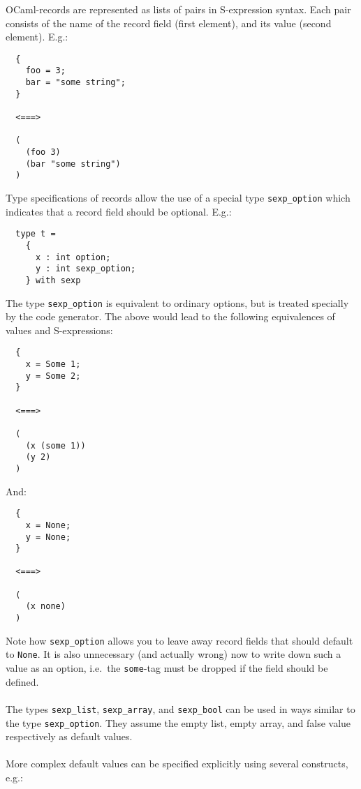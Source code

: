 \documentclass[a4paper]{article}
\begin{document}
OCaml-records are represented as lists of pairs in S-expression syntax.
Each pair consists of the name of the record field (first element),
and its value (second element).  E.g.:

\begin{verbatim}
  {
    foo = 3;
    bar = "some string";
  }

  <===>

  (
    (foo 3)
    (bar "some string")
  )
\end{verbatim}

Type specifications of records allow the use of a special type
\verb=sexp_option= which indicates that a record field should be optional.
E.g.:

\begin{verbatim}
  type t =
    {
      x : int option;
      y : int sexp_option;
    } with sexp
\end{verbatim}

The type \verb=sexp_option= is equivalent to ordinary options, but is
treated specially by the code generator.  The above would lead to the
following equivalences of values and S-expressions:

\begin{verbatim}
  {
    x = Some 1;
    y = Some 2;
  }

  <===>

  (
    (x (some 1))
    (y 2)
  )
\end{verbatim}

\noindent And:

{\samepage
\begin{verbatim}
  {
    x = None;
    y = None;
  }

  <===>

  (
    (x none)
  )
\end{verbatim}
}

Note how \verb=sexp_option= allows you to leave away record fields
that should default to \verb=None=.  It is also unnecessary (and
actually wrong) now to write down such a value as an option, i.e.\
the \verb=some=-tag must be dropped if the field should be defined.\\
\\
The types \verb=sexp_list=, \verb=sexp_array=, and \verb=sexp_bool= can be
used in ways similar to the type \verb=sexp_option=.  They assume the empty
list, empty array, and false value respectively as default values.\\
\\
More complex default values can be specified explicitly using several
constructs, e.g.:
\end{document}
